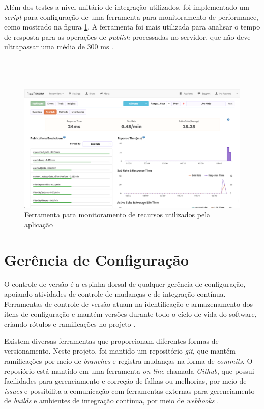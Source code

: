 Além dos testes a nível unitário de integração utilizados, foi implementado um \textit{script} para configuração de uma ferramenta  para monitoramento de performance, como mostrado na figura \ref{fig:profile}. A ferramenta foi mais utilizada para analisar o tempo de resposta para as operações de \textit{publish} processadas no servidor, que não deve ultrapassar uma média de 300 ms \cite{kadira2015}.
\\ 
\\
\\
\\
\begin{figure}[h!]
  	\centering
  	\includegraphics[width=.7\linewidth]{figuras/profile.eps}
  	\caption{Ferramenta para monitoramento de recursos utilizados pela aplicação}
  	\label{fig:profile}
\end{figure}

\section{Gerência de Configuração}

O controle de versão é a espinha dorsal de qualquer gerência de configuração, apoiando atividades de controle de mudanças e de integração contínua. Ferramentas de controle de versão atuam na identificação e armazenamento dos itens de configuração e mantém versões durante todo o cíclo de vida do software, criando rótulos e ramificações no projeto \cite{swebok2014}. 

Existem diversas ferramentas que proporcionam diferentes formas de versionamento. Neste projeto, foi mantido um repositório \textit{git}, que mantém ramificações por meio de \textit{branches} e registra mudanças na forma de \textit{commits}. O reposiório está mantido em uma ferramenta \textit{on-line} chamada \textit{Github}, que possui facilidades para gerenciamento e correção de falhas ou melhorias, por meio de \textit{issues} e possibilita a comunicação com ferramentas externas para gerenciamento de \textit{builds} e ambientes de integração contínua, por meio de \textit{webhooks} \cite{github2015}. 

